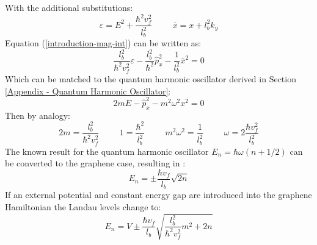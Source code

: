 			With the additional substitutions:
			\begin{equation}
				\varepsilon=E^{2}+\frac{\hbar^{2}v_{f}^{2}}{l_{b}^{2}}\hspace{1cm}{\bar x}=x+l_{b}^{2}k_{y}
			\end{equation}
			Equation (\ref{introduction-mag-int}) can be written as:
			\begin{equation}
				\frac{l_{b}^{2}}{\hbar^{2}v_{f}^{2}}\varepsilon-\frac{l_{b}^{2}}{\hbar^{2}}\hat{p}_{x}^{2}-\frac{1}{l_{b}^{2}}{\bar x}^{2}=0
			\end{equation}
			Which can be matched to the quantum harmonic oscillator derived in Section \ref{Appendix - Quantum Harmonic Oscillator}:
			\begin{equation}
				2mE-\hat{p}_{x}^{2}-m^{2}\omega^{2}x^{2}=0
			\end{equation}
			Then by analogy:
			\begin{equation}
				2m=\frac{l_{b}^{2}}{\hbar^{2}v_{f}^{2}}\hspace{1cm}1=\frac{\hbar^{2}}{l_{b}^{2}}\hspace{1cm}m^{2}\omega^{2}=\frac{1}{l_{b}^{2}}\hspace{1cm}\omega=2\frac{\hbar v_{f}^{2}}{l_{b}^{2}}
			\end{equation}
			The known result for the quantum harmonic oscillator $E_{n}=\hbar\omega\left(n+1/2\right)$ can be converted to the graphene case, resulting in \cite{b37, b53}:
			\begin{equation}
				E_{n}=\pm \frac{\hbar v_{f}}{l_{b}}\sqrt{2n}
				\label{landau-levels-e}
			\end{equation}
			If an external potential and constant energy gap are introduced into the graphene Hamiltonian the Landau levels change to:
			\begin{equation}
				E_{n}=V \pm \frac{\hbar v_{f}}{l_{b}}\sqrt{\frac{l_{b}^{2}}{\hbar^{2}v_{f}^{2}}m^{2}+2n}
				\label{landau-levels-e-m}
			\end{equation}

